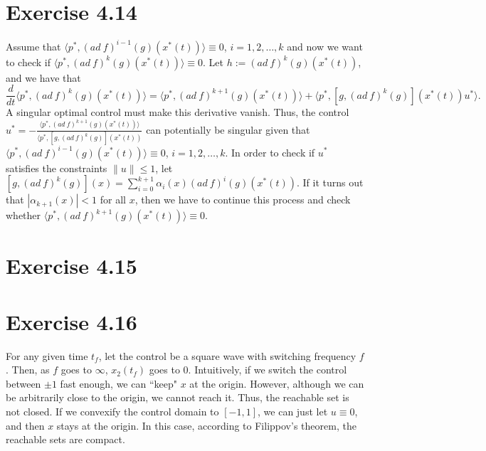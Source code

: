 \documentclass[11pt]{report}
\begin{document}
\section*{Exercise 4.14}
Assume that $\langle p^*, (ad~f)^{i-1}(g)(x^*(t)) \rangle \equiv 0$, $i=1,2,\ldots,k$ and now we want to check if $\langle p^*, (ad~f)^k(g)(x^*(t)) \rangle \equiv 0$. Let $h := (ad~f)^k(g)(x^*(t))$, and we have that
\[
\frac{d}{dt}\langle p^*, (ad~f)^k(g)(x^*(t)) \rangle = \langle p^*, (ad~f)^{k+1}(g)(x^*(t)) \rangle + \langle p^*, [g,(ad~f)^k(g)](x^*(t))u^*\rangle.
\]
A singular optimal control must make this derivative vanish. Thus, the control $u^* = -\frac{\langle p^*, (ad~f)^{k+1}(g)(x^*(t)) \rangle}{\langle p^*, [g,(ad~f)^k(g)](x^*(t))}$ can potentially be singular given that $\langle p^*, (ad~f)^{i-1}(g)(x^*(t)) \rangle \equiv 0$, $i=1,2,\ldots,k$. In order to check if $u^*$ satisfies the constraints $\|u\| \leq 1$, let $[g, (ad~f)^{k}(g)](x) = \sum_{i=0}^{k+1}\alpha_i(x) (ad~f)^{i}(g)(x^*(t))$. If it turns out that $|\alpha_{k+1}(x)| < 1$ for all $x$, then we have to continue this process and check whether $\langle p^*, (ad~f)^{k+1}(g)(x^*(t)) \rangle \equiv 0$.

\section*{Exercise 4.15}
\section*{Exercise 4.16}
For any given time $t_f$, let the control be a square wave with switching frequency $f$. Then, as $f$ goes to $\infty$, $x_2(t_f)$ goes to $0$. Intuitively, if we switch the control between $\pm 1$ fast enough, we can ``keep" $x$ at the origin. However, although we can be arbitrarily close to the origin, we cannot reach it. Thus, the reachable set is not closed. If we convexify the control domain to $[-1,1]$, we can just let $u \equiv 0$, and then $x$ stays at the origin. In this case, according to Filippov’s theorem, the reachable sets are compact.
\end{document}
